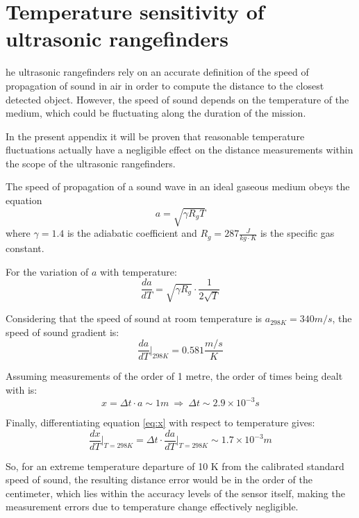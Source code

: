 
\chapter{Temperature sensitivity of ultrasonic rangefinders} \label{app:temperature}

he ultrasonic rangefinders rely on an accurate definition of the speed of propagation of sound in air in order to compute the distance to the closest detected object.
However, the speed of sound depends on the temperature of the medium, which could be fluctuating along the duration of the mission.

In the present appendix it will be proven that reasonable temperature fluctuations actually have a negligible effect on the distance measurements within the scope of the ultrasonic rangefinders.

The speed of propagation of a sound wave in an ideal gaseous medium obeys the equation
\begin{equation}
	a=\sqrt{\gamma R_g T}
\end{equation}
where $\gamma=1.4$ is the adiabatic coefficient and $R_g=287\frac{J}{kg\cdot K}$ is the specific gas constant.

For the variation of $a$ with temperature:
\begin{equation}
	\frac{da}{dT}=\sqrt{\gamma R_g}\cdot \frac{1}{2\sqrt{T}}
\end{equation}

Considering that the speed of sound at room temperature is $a_{298 K}=340 m/s$, the speed of sound gradient is:
\begin{equation}
	\frac{da}{dT}\Bigg\rvert_{298 K} = 0.581 \frac{m/s}{K}
\end{equation}

Assuming measurements of the order of 1 metre, the order of times being dealt with is:
\begin{equation}
	x=\Delta t \cdot a \sim 1 m \ \Rightarrow\ \Delta t \sim 2.9\times 10^{-3} s
	\label{eq:x}
\end{equation}

Finally, differentiating equation \eqref{eq:x} with respect to temperature gives:
\begin{equation}
	\frac{dx}{dT}\Bigg\rvert_{T=298K} = \Delta t\cdot \frac{da}{dT}\Bigg\rvert_{T=298K} \sim 1.7\times 10^{-3} m
\end{equation}

So, for an extreme temperature departure of 10 K from the calibrated standard speed of sound, the resulting distance error would be in the order of the centimeter, which lies within the accuracy levels of the sensor itself, making the measurement errors due to temperature change effectively negligible.
